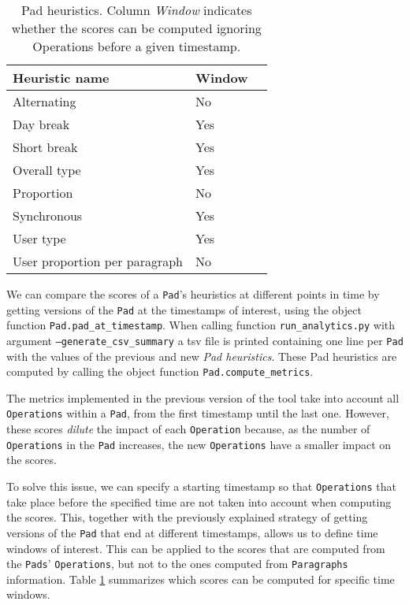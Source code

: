       \begin{table}[htp]
        \caption{Pad heuristics. Column \textit{Window} indicates whether the scores can be computed ignoring Operations before a given timestamp.}
        \label{tab:pad_h}
        \centering
        \begin{tabular}{lll}
            \hline
            \textbf{Heuristic name} & \textbf{Window} & \textbf{} \\
            \hline
            Alternating & No & \\
            Day break & Yes & \\
            Short break & Yes & \\
            Overall type & Yes & \\
            Proportion & No & \\
            Synchronous & Yes & \\
            User type & Yes & \\
            User proportion per paragraph & No & \\
            \hline
        \end{tabular}
      \end{table}
    We can compare the scores of a \texttt{Pad}'s heuristics at different points in time by getting versions of the \texttt{Pad} at the timestamps of interest, using the object function \texttt{Pad.pad\_at\_timestamp}. When calling function \texttt{run\_analytics.py} with argument \texttt{--generate\_csv\_summary} a tsv file is printed containing one line per \texttt{Pad} with the values of the previous and new \textit{Pad heuristics}. These Pad heuristics are computed by calling the object function \texttt{Pad.compute\_metrics}.
 
    The metrics implemented in the previous version of the tool take into account all \texttt{Operations} within a \texttt{Pad}, from the first timestamp until the last one. However, these scores \textit{dilute} the impact of each \texttt{Operation} because, as the number of \texttt{Operations} in the \texttt{Pad} increases, the new \texttt{Operations} have a smaller impact on the scores.

    To solve this issue, we can specify a starting timestamp so that \texttt{Operations} that take place before the specified time are not taken into account when computing the scores. This, together with the previously explained strategy of getting versions of the \texttt{Pad} that end at different timestamps, allows us to define time windows of interest. This can be applied to the scores that are computed from the \texttt{Pads}' \texttt{Operations}, but not to the ones computed from \texttt{Paragraphs} information. Table \ref{tab:pad_h} summarizes which scores can be computed for specific time windows.

